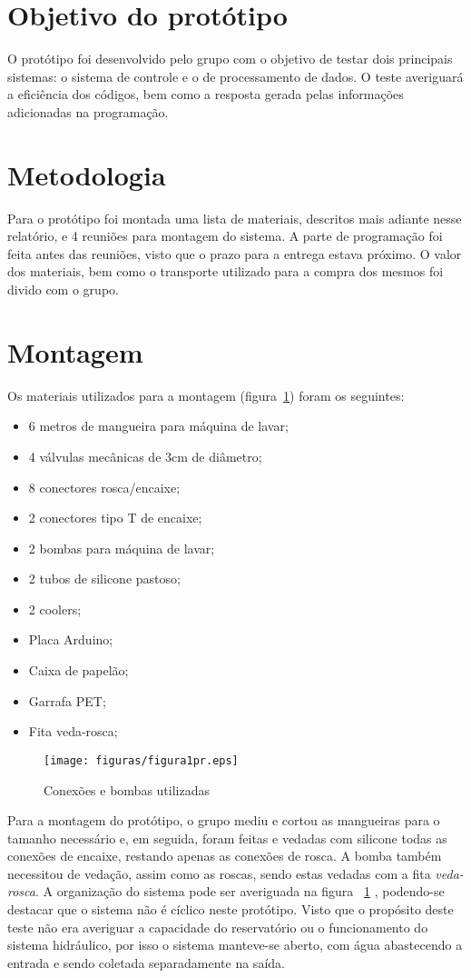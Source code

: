 \section{Objetivo do protótipo}
O protótipo foi desenvolvido pelo grupo com o objetivo de testar dois principais sistemas: o sistema de controle e o de processamento de dados. O teste averiguará a eficiência dos códigos, bem como a resposta gerada pelas informações adicionadas na programação.
\section{Metodologia}
Para o protótipo foi montada uma lista de materiais, descritos mais adiante nesse relatório, e 4 reuniões para montagem do sistema. A parte de programação foi feita antes das reuniões, visto que o prazo para a entrega estava próximo. O valor dos materiais, bem como o transporte utilizado para a compra dos mesmos foi divido com o grupo.
\section{Montagem}
Os materiais utilizados para a montagem (figura~\ref{fig1pr}) foram os seguintes:
\begin{itemize}
	\item   6 metros de mangueira para máquina de lavar;
	\item	4 válvulas mecânicas de 3cm de diâmetro;
	\item	8 conectores rosca/encaixe;
	\item	2 conectores tipo T de encaixe;
	\item	2 bombas para máquina de lavar; 
	\item	2 tubos de silicone pastoso;
	\item	2 coolers;
	\item	Placa Arduino;
	\item	Caixa de papelão;
	\item	Garrafa PET; 
	\item	Fita veda-rosca;
\end{itemize}
\begin{figure}[!htb]                  
	\centering                          
	\texttt{[image: figuras/figura1pr.eps]}
	\caption{Conexões e bombas utilizadas} \label{fig1pr}              
\end{figure}	
\newpage
Para a montagem do protótipo, o grupo mediu e cortou as mangueiras para o tamanho necessário e, em seguida, foram feitas e vedadas com silicone todas as conexões de encaixe, restando apenas as conexões de rosca. A bomba também necessitou de vedação, assim como as roscas, sendo estas vedadas com a fita \emph{veda-rosca}. A organização do sistema pode ser averiguada na figura ~\ref{fig1pr} , podendo-se destacar que o sistema não é cíclico neste protótipo. Visto que o propósito deste teste não era averiguar a capacidade do reservatório ou o funcionamento do sistema hidráulico, por isso o sistema manteve-se aberto, com água abastecendo a entrada e sendo coletada separadamente na saída.
